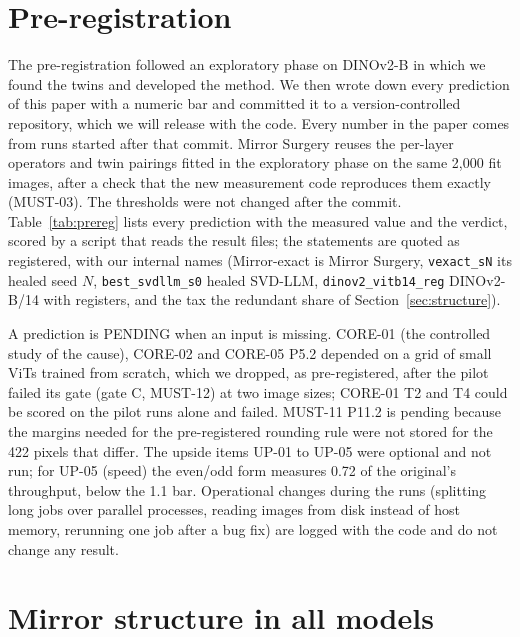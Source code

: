 \section{Pre-registration}
\label{app:prereg}

The pre-registration followed an exploratory phase on DINOv2-B in which we found the twins and developed the method.
We then wrote down every prediction of this paper with a numeric bar and committed it to a version-controlled
repository, which we will release with the code. Every number in the paper comes from runs started after that
commit. Mirror Surgery reuses the per-layer operators and twin pairings fitted in the exploratory phase on the same
2{,}000 fit images, after a check that the new measurement code reproduces them exactly (MUST-03). The thresholds were
not changed after the commit. Table~\ref{tab:prereg} lists every prediction with the measured value and the verdict,
scored by a script that reads the result files; the statements are quoted as registered, with our internal names
(Mirror-exact is Mirror Surgery, \texttt{vexact\_sN} its healed seed $N$, \texttt{best\_svdllm\_s0} healed SVD-LLM,
\texttt{dinov2\_vitb14\_reg} DINOv2-B/14 with registers, and the tax the redundant share of Section~\ref{sec:structure}).

A prediction is PENDING when an input is missing. CORE-01 (the controlled study of the cause), CORE-02 and CORE-05
P5.2 depended on a grid of small ViTs trained from scratch, which we dropped, as pre-registered, after the pilot failed
its gate (gate C, MUST-12) at two image sizes; CORE-01 T2 and T4 could be scored on the pilot runs alone and failed.
MUST-11 P11.2 is pending because the margins needed for the pre-registered rounding rule were not stored for the 422
pixels that differ. The upside items UP-01 to UP-05 were optional and not run; for UP-05 (speed) the even/odd form
measures 0.72 of the original's throughput, below the 1.1 bar. Operational changes during the runs (splitting long
jobs over parallel processes, reading images from disk instead of host memory, rerunning one job after a bug fix) are
logged with the code and do not change any result.



\section{Mirror structure in all models}
\label{app:structure}

